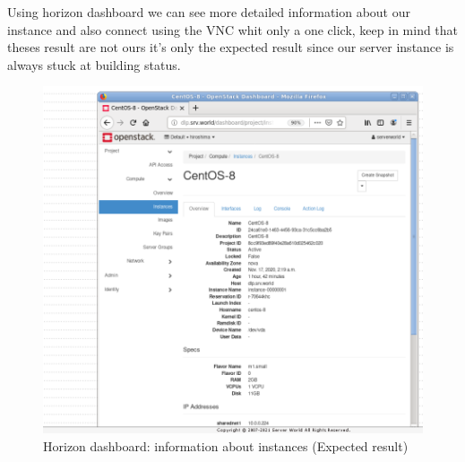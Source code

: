 \begin{spacing}{1.2}
\par Using horizon dashboard we can see more detailed information about our instance and also connect using the VNC whit only a one click, keep in mind that theses result are not ours it's only the expected result since our server instance is always stuck at building status.
\\
\begin{figure}[!htb] 
\begin{center} 
\includegraphics[width=1\linewidth]{Cloud/Configure Horizon/C_10_expected result, since our instance is always at the building state we can't see this page.png} 
\end{center} 
\caption{  Horizon dashboard: information about instances (Expected result)} 
\end{figure} 
\FloatBarrier
\\



\end{spacing}
